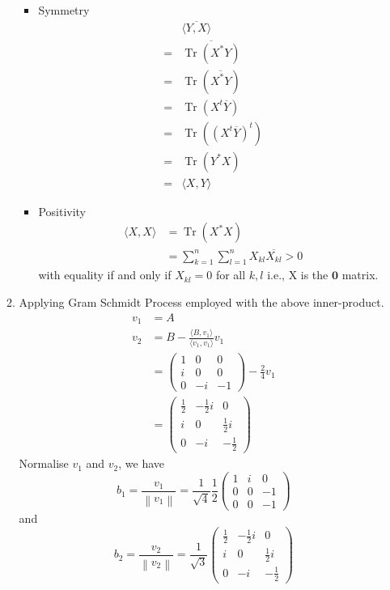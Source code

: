 \documentclass[12pt]{article}
\DeclareMathOperator{\Tr}{Tr}
\newcommand\norm[1]{\left\lVert#1\right\rVert}
\theoremstyle{definition}
\begin{document}
\begin{enumerate}
\begin{enumerate}
\begin{itemize}
\begin{align*}
    \end{align*}
    \item Symmetry
    \begin{align*}
    &\overline{\langle Y,X\rangle} \\
    =&\overline{\Tr(X^\ast Y)}\\
    =&\Tr(\overline{X^\ast Y})\\
    =&\Tr(X^t \overline{Y})\\
    =&\Tr((X^t \overline{Y})^t)\\
    =&\Tr(Y^\ast X)\\
    =&\langle X,Y\rangle
    \end{align*}
    \item Positivity 
    \begin{align*}
\langle X,X\rangle &= \Tr(X^\ast X)\\
&=\sum_{k=1}^n\sum_{l=1}^n X_{kl}\overline{X_{kl}}>0 
    \end{align*}
with equality if and only if  $X_{kl}=0$ for all $k,l$ i.e., X is the $\mathbf{0}$ matrix.
  \end{itemize}
  \item Applying Gram Schmidt Process employed with the above inner-product.
  \begin{align*}
  v_1&=A\\
  v_2 &= B-\frac{\langle B,v_1\rangle}{\langle v_1,v_1\rangle}v_1\\
  &= \begin{pmatrix}1&0&0\\i&0&0\\0&-i&-1\end{pmatrix}-\frac{2}{4}v_1\\
  &=\begin{pmatrix}\frac{1}{2}&-\frac{1}{2}i&0\\i&0&\frac{1}{2}i\\0&-i&-\frac{1}{2}\end{pmatrix}
  \end{align*}
  Normalise $v_1$ and $v_2$, we have
  \[
b_1 = \frac{v_1}{\norm{v_1}}=\frac{1}{\sqrt{4}}\frac{1}{2}\begin{pmatrix}1&i&0\\0&0&-1\\0&0&-1\end{pmatrix}
  \]
  and
  \[
b_2 = \frac{v_2}{\norm{v_2}} = \frac{1}{\sqrt{3}}\begin{pmatrix}\frac{1}{2}&-\frac{1}{2}i&0\\i&0&\frac{1}{2}i\\0&-i&-\frac{1}{2}\end{pmatrix}
  \]
\end{enumerate}
\end{enumerate}
\end{document}
